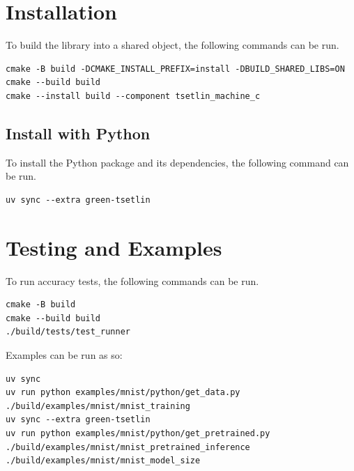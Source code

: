 \section{Installation}
To build the library into a shared object, the following commands can be run.

\begin{listing}[!htbp]
    \caption{Library installation commands\label{lst:install-commands}}
    \begin{verbatim}
cmake -B build -DCMAKE_INSTALL_PREFIX=install -DBUILD_SHARED_LIBS=ON
cmake --build build
cmake --install build --component tsetlin_machine_c
    \end{verbatim}
\end{listing}
\FloatBarrier

\subsection{Install with Python}
To install the Python package and its dependencies, the following command can be run.

\begin{listing}[!htbp]
    \caption{Python environment synchronization\label{lst:python-sync}}
    \begin{verbatim}
uv sync --extra green-tsetlin
    \end{verbatim}
\end{listing}
\FloatBarrier

\section{Testing and Examples}
To run accuracy tests, the following commands can be run.

\begin{listing}[!htbp]
    \caption{Running accuracy tests\label{lst:run-tests}}
    \begin{verbatim}
cmake -B build
cmake --build build
./build/tests/test_runner
    \end{verbatim}
\end{listing}
\FloatBarrier

Examples can be run as so:

\begin{listing}[!htbp]
    \caption{Running MNIST examples\label{lst:run-examples}}
    \begin{verbatim}
uv sync
uv run python examples/mnist/python/get_data.py
./build/examples/mnist/mnist_training
uv sync --extra green-tsetlin
uv run python examples/mnist/python/get_pretrained.py
./build/examples/mnist/mnist_pretrained_inference
./build/examples/mnist/mnist_model_size
    \end{verbatim}
\end{listing}
\FloatBarrier